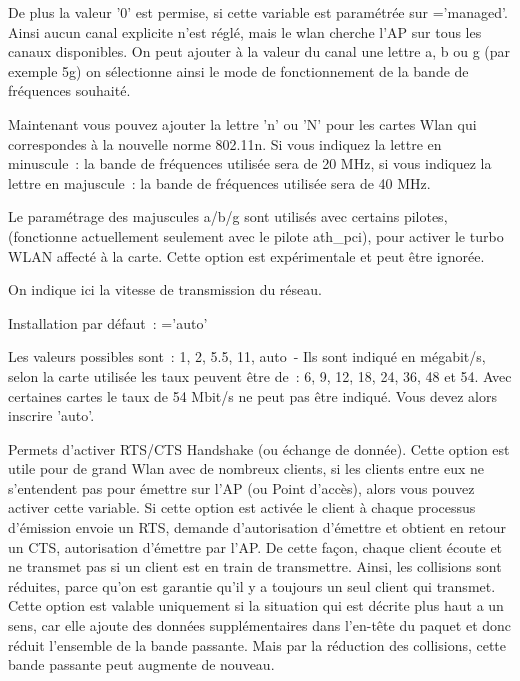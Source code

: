 \begin{description}
      De plus la valeur '0' est permise, si cette variable est paramétrée sur
      ='managed'. Ainsi aucun canal explicite n'est réglé,
      mais le wlan cherche l'AP sur tous les canaux disponibles. On peut ajouter
      à la valeur du canal une lettre a, b ou g (par exemple 5g) on sélectionne
      ainsi le mode de fonctionnement de la bande de fréquences souhaité.

      Maintenant vous pouvez ajouter la lettre 'n' ou 'N' pour les cartes Wlan
      qui correspondes à la nouvelle norme 802.11n. Si vous indiquez la lettre
      en minuscule~: la bande de fréquences utilisée sera de 20 MHz, si vous
      indiquez la lettre en majuscule~: la bande de fréquences utilisée sera de 40 MHz.

      Le paramétrage des majuscules a/b/g sont utilisés avec certains pilotes,
      (fonctionne actuellement seulement avec le pilote ath\_pci), pour activer
      le turbo WLAN affecté à la carte. Cette option est expérimentale et peut
      être ignorée.


      On indique ici la vitesse de transmission du réseau.

      Installation par défaut~: ='auto'

      Les valeurs possibles sont~: 1, 2, 5.5, 11, auto~- Ils sont indiqué en
      mégabit/s, selon la carte utilisée les taux peuvent être de~: 6, 9, 12, 18,
      24, 36, 48 et 54. Avec certaines cartes le taux de 54 Mbit/s ne peut pas
      être indiqué. Vous devez alors inscrire 'auto'.


      Permets d'activer RTS/CTS Handshake (ou échange de donnée). Cette option
      est utile pour de grand Wlan avec de nombreux clients, si les clients
      entre eux ne s'entendent pas pour émettre sur l'AP (ou Point d'accès),
      alors vous pouvez activer cette variable. Si cette option est activée le
      client à chaque processus d'émission envoie un RTS, demande d'autorisation
      d'émettre et obtient en retour un CTS, autorisation d'émettre par l'AP.
      De cette façon, chaque client écoute et ne transmet pas si un client est
      en train de transmettre. Ainsi, les collisions sont réduites, parce qu'on
      est garantie qu'il y a toujours un seul client qui transmet. Cette option
      est valable uniquement si la situation qui est décrite plus haut a un sens,
      car elle ajoute des données supplémentaires dans l'en-tête du paquet et
      donc réduit l'ensemble de la bande passante. Mais par la réduction des
      collisions, cette bande passante peut augmente de nouveau.


\end{description}
